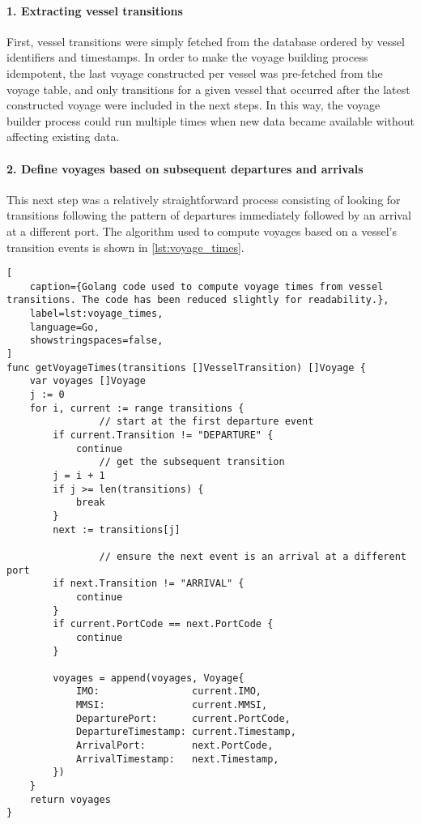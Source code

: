 \paragraph{1. Extracting vessel transitions}

First, vessel transitions were simply fetched from the database ordered by vessel identifiers and timestamps. In order to make the voyage building process idempotent, the last voyage constructed per vessel was pre-fetched from the voyage table, and only transitions for a given vessel that occurred after the latest constructed voyage were included in the next steps. In this way, the voyage builder process could run multiple times when new data became available without affecting existing data.

\paragraph{2. Define voyages based on subsequent departures and arrivals}

This next step was a relatively straightforward process consisting of looking for transitions following the pattern of departures immediately followed by an arrival at a different port. The algorithm used to compute voyages based on a vessel's transition events is shown in \cref{lst:voyage_times}.

\begin{lstlisting}[
    caption={Golang code used to compute voyage times from vessel transitions. The code has been reduced slightly for readability.},
    label=lst:voyage_times,
    language=Go,
    showstringspaces=false,
]
func getVoyageTimes(transitions []VesselTransition) []Voyage {
	var voyages []Voyage
	j := 0
	for i, current := range transitions {
                // start at the first departure event
		if current.Transition != "DEPARTURE" {
			continue
                // get the subsequent transition
		j = i + 1
		if j >= len(transitions) {
			break
		}
		next := transitions[j]

                // ensure the next event is an arrival at a different port
		if next.Transition != "ARRIVAL" {
			continue
		}
		if current.PortCode == next.PortCode {
			continue
		}

		voyages = append(voyages, Voyage{
			IMO:                current.IMO,
			MMSI:               current.MMSI,
			DeparturePort:      current.PortCode,
			DepartureTimestamp: current.Timestamp,
			ArrivalPort:        next.PortCode,
			ArrivalTimestamp:   next.Timestamp,
		})
	}
	return voyages
}
\end{lstlisting}

